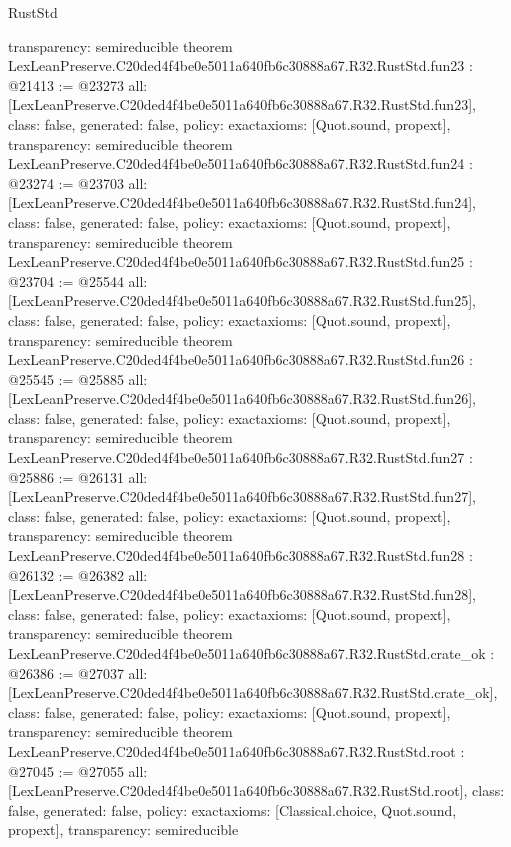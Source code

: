 \begin{lexlean}{RustStd}
\begin{coremodule}
{  transparency: semireducible
}
theorem LexLeanPreserve.C20ded4f4be0e5011a640fb6c30888a67.R32.RustStd.fun23 : @21413 := @23273 {
  all: [LexLeanPreserve.C20ded4f4be0e5011a640fb6c30888a67.R32.RustStd.fun23],
  class: false,
  generated: false,
  policy: exact{axioms: [Quot.sound, propext]},
  transparency: semireducible
}
theorem LexLeanPreserve.C20ded4f4be0e5011a640fb6c30888a67.R32.RustStd.fun24 : @23274 := @23703 {
  all: [LexLeanPreserve.C20ded4f4be0e5011a640fb6c30888a67.R32.RustStd.fun24],
  class: false,
  generated: false,
  policy: exact{axioms: [Quot.sound, propext]},
  transparency: semireducible
}
theorem LexLeanPreserve.C20ded4f4be0e5011a640fb6c30888a67.R32.RustStd.fun25 : @23704 := @25544 {
  all: [LexLeanPreserve.C20ded4f4be0e5011a640fb6c30888a67.R32.RustStd.fun25],
  class: false,
  generated: false,
  policy: exact{axioms: [Quot.sound, propext]},
  transparency: semireducible
}
theorem LexLeanPreserve.C20ded4f4be0e5011a640fb6c30888a67.R32.RustStd.fun26 : @25545 := @25885 {
  all: [LexLeanPreserve.C20ded4f4be0e5011a640fb6c30888a67.R32.RustStd.fun26],
  class: false,
  generated: false,
  policy: exact{axioms: [Quot.sound, propext]},
  transparency: semireducible
}
theorem LexLeanPreserve.C20ded4f4be0e5011a640fb6c30888a67.R32.RustStd.fun27 : @25886 := @26131 {
  all: [LexLeanPreserve.C20ded4f4be0e5011a640fb6c30888a67.R32.RustStd.fun27],
  class: false,
  generated: false,
  policy: exact{axioms: [Quot.sound, propext]},
  transparency: semireducible
}
theorem LexLeanPreserve.C20ded4f4be0e5011a640fb6c30888a67.R32.RustStd.fun28 : @26132 := @26382 {
  all: [LexLeanPreserve.C20ded4f4be0e5011a640fb6c30888a67.R32.RustStd.fun28],
  class: false,
  generated: false,
  policy: exact{axioms: [Quot.sound, propext]},
  transparency: semireducible
}
theorem LexLeanPreserve.C20ded4f4be0e5011a640fb6c30888a67.R32.RustStd.crate_ok : @26386 := @27037 {
  all: [LexLeanPreserve.C20ded4f4be0e5011a640fb6c30888a67.R32.RustStd.crate_ok],
  class: false,
  generated: false,
  policy: exact{axioms: [Quot.sound, propext]},
  transparency: semireducible
}
theorem LexLeanPreserve.C20ded4f4be0e5011a640fb6c30888a67.R32.RustStd.root : @27045 := @27055 {
  all: [LexLeanPreserve.C20ded4f4be0e5011a640fb6c30888a67.R32.RustStd.root],
  class: false,
  generated: false,
  policy: exact{axioms: [Classical.choice, Quot.sound, propext]},
  transparency: semireducible
}


\end{coremodule}
\end{lexlean}
